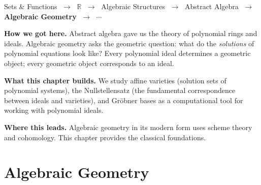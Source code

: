 \begin{tcolorbox}[
  colback=gray!6,
  colframe=gray!40,
  arc=2pt,
  left=8pt, right=8pt, top=6pt, bottom=6pt,
  title={\small\textbf{Where You Are in the Journey}},
  fonttitle=\small\bfseries
]
\begin{center}
\small
Sets \& Functions
$\;\to\;$ $\mathbb{R}$
$\;\to\;$ Algebraic Structures
$\;\to\;$ Abstract Algebra
$\;\to\;$ \textbf{Algebraic Geometry}
$\;\to\;$ $\cdots$
\end{center}

\medskip
\noindent\textbf{How we got here.}
Abstract algebra gave us the theory of polynomial rings and ideals.
Algebraic geometry asks the geometric question: what do the
\emph{solutions} of polynomial equations look like?
Every polynomial ideal determines a geometric object; every geometric
object corresponds to an ideal.

\medskip
\noindent\textbf{What this chapter builds.}
We study affine varieties (solution sets of polynomial systems),
the Nullstellensatz (the fundamental correspondence between ideals
and varieties), and Gröbner bases as a computational tool for
working with polynomial ideals.

\medskip
\noindent\textbf{Where this leads.}
Algebraic geometry in its modern form uses scheme theory and
cohomology. This chapter provides the classical foundations.
\end{tcolorbox}
\vspace{1em}

\section{Algebraic Geometry}
